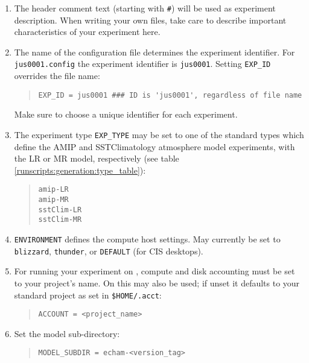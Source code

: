 \begin{enumerate}

\item
The header comment text (starting with \texttt{\#}) will be used as experiment
description. When writing your own files, take care to describe important
characteristics of your experiment here.

\item
The name of the configuration file determines the experiment identifier. For
\verb|jus0001.config| the experiment identifier is \verb|jus0001|. Setting
\verb|EXP_ID| overrides the file name:
%
\begin{quote}
\begin{verbatim}
EXP_ID = jus0001 ### ID is 'jus0001', regardless of file name
\end{verbatim}
\end{quote}

Make sure to choose a unique identifier for each experiment.

\item
The experiment type \texttt{EXP\_TYPE} may be set to one of the standard types
which define the AMIP and SSTClimatology atmosphere model experiments, with the
LR or MR model, respectively (see table
\ref{runscripts:generation:type_table}):
%
\begin{quote}
\begin{verbatim}
amip-LR
amip-MR
sstClim-LR
sstClim-MR
\end{verbatim}
\end{quote}

\item
\texttt{ENVIRONMENT} defines the compute host settings. May currently be set to
\texttt{blizzard}, \texttt{thunder}, or \texttt{DEFAULT} (for CIS desktops).

\item 
For running your experiment on \thunder, compute and disk accounting must
be set to your project's name. On \blizzard{} this may also be used; if
unset it defaults to your standard project as set in \verb|$HOME/.acct|:
%
\begin{quote}
\begin{verbatim}
ACCOUNT = <project_name>
\end{verbatim}
\end{quote}

\item
Set the model sub-directory:
%
\begin{quote}
\begin{verbatim}
MODEL_SUBDIR = echam-<version_tag>
\end{verbatim}
\end{quote}


\end{enumerate}
